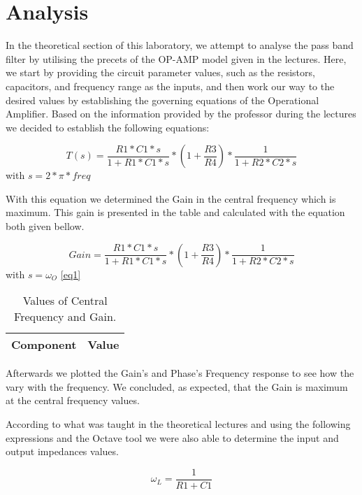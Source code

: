 \section{Analysis}

In the theoretical section of this laboratory, we attempt to analyse the pass band filter by utilising the precets of the OP-AMP model given in the lectures.
Here, we start by providing the circuit parameter values, such as the resistors, capacitors, and frequency range as the inputs, and then work our way to the desired values by establishing the governing equations of the Operational Amplifier. Based on the information provided by the professor during the lectures we decided to establish the following equations:

\begin{equation}
T(s)= \frac{R1*C1*s}{1+R1*C1*s} * (1+\frac{R3}{R4}) * \frac{1}{1+R2*C2*s}
\end{equation}
with $s=2*\pi*freq$

With this equation we determined the Gain in the central frequency which is maximum. This gain is presented in the table and calculated with the equation both given bellow.

\begin{equation}
Gain= \frac{R1*C1*s}{1+R1*C1*s} * (1+\frac{R3}{R4}) * \frac{1}{1+R2*C2*s}
\end{equation}
with $s=\omega_O$ \ref{eq1}

\begin{table}[h]
  \centering
  \begin{tabular}{|l|r|}
    \hline    
    {\bf Component} & {\bf Value} \\ \hline
    
  \end{tabular}
  \caption{Values of Central Frequency and Gain.}
  \label{tab:valintro}
\end{table}

Afterwards we plotted the Gain's and Phase's Frequency response to see how the vary with the frequency. We concluded, as expected, that the Gain is maximum at the central frequency values.

According to what was taught in the theoretical lectures and using the following expressions and the Octave tool we were also able to determine the input and output impedances values.

\begin{equation}
\omega_L = \frac{1}{R1+C1}
\end{equation}

